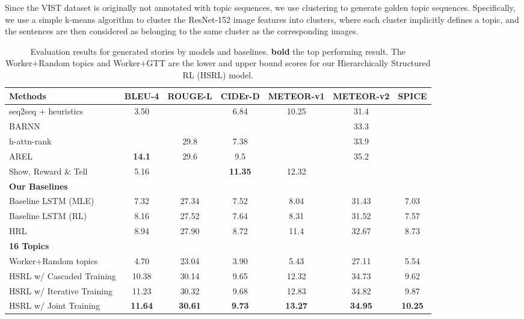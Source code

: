 \documentclass[letterpaper]{article} \usepackage{aaai19}  \usepackage{times}  \usepackage{helvet}  \usepackage{courier}  \usepackage{url}  \usepackage{graphicx}
\begin{document}
Since the VIST dataset \cite{huang2016visual} is originally not annotated with topic sequences, we use clustering to generate golden topic sequences. Specifically, we use a simple k-means algorithm to cluster the ResNet-152 image features into  clusters, where each cluster implicitly defines a topic, and the  sentences are then considered as belonging to the same cluster as the corresponding images. 




{\small
	\begin{table*}[htb]
		\small
		\caption{\small Evaluation results for generated stories by models and baselines. \textbf{bold} the top performing result. The Worker+Random topics and Worker+GTT are the lower and upper bound scores for our Hierarchically Structured RL (HSRL) model. }
\label{table:BLEU}
		\centering
		\begin{tabular}{lcccccc}
			\hline
			Methods       & BLEU-4 & ROUGE-L &   CIDEr-D & METEOR-v1 & METEOR-v2 & SPICE\\
			\hline
seq2seq + heuristics~\cite{huang2016visual} & 3.50 &  & 6.84 & 10.25 & 31.4 & \\
BARNN~\cite{liu2017let} &  &  &  &  & 33.3 & \\
			h-attn-rank~\cite{yu2017hierarchically} &  & 29.8 & 7.38  &  & 33.9 & \\
			AREL~\cite{wang2018no} & \textbf{14.1} & 29.6 & 9.5  &  & 35.2 & \\
			Show, Reward \& Tell~\cite{wang2018show} & 5.16 &  & \textbf{11.35}  & 12.32 &  & \\
			\hline
			\multicolumn{7}{l}{\textbf{Our Baselines}} \\
			\hline
			Baseline LSTM (MLE)  & 7.32 & 27.34 & 7.52 & 8.04 & 31.43 & 7.03\\
			Baseline LSTM (RL)  & 8.16 & 27.52 & 7.64 & 8.31 & 31.52 & 7.57\\
			HRL~\cite{wang2018video} & 8.94 & 27.90 & 8.72 & 11.4 & 32.67 & 8.73 \\
			\hline
			\multicolumn{7}{l}{\textbf{16 Topics}} \\
			\hline
			Worker+Random topics & 4.70 & 23.04 & 3.90 & 5.43 & 27.11 & 5.54\\
			HSRL w/ Cascaded Training & 10.38 & 30.14 & 9.65 & 12.32 & 34.73 & 9.62\\
			HSRL w/ Iterative Training & 11.23 & 30.32 & 9.68 & 12.83 & 34.82 & 9.87 \\
			HSRL w/ Joint Training & \textbf{11.64} & \textbf{30.61} &  \textbf{9.73}&  \textbf{13.27}&  \textbf{34.95} &   \textbf{10.25} \\

\end{tabular}
\end{table*}}
\end{document}
